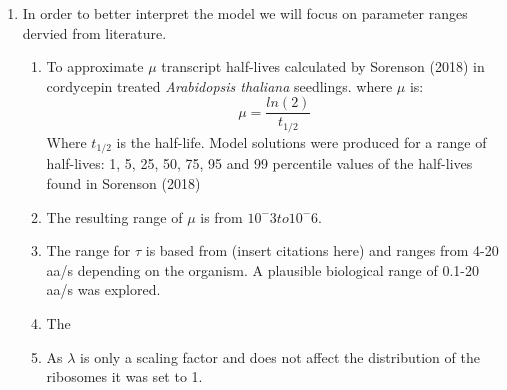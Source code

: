 \documentclass[review]{elsarticle}
\begin{document}
\begin{enumerate}
\begin{enumerate}
		\item In order to better interpret the model we will focus on parameter ranges dervied from literature. 
		\begin{enumerate}
			\item To approximate $\mu$ transcript half-lives calculated by Sorenson (2018) in cordycepin treated  \textit{Arabidopsis thaliana} seedlings. where $\mu$ is:
			\begin{equation}\label{eq:eq_unmarked_sum}
				\mu = \frac{ln(2)}{t_{1/2}}
			\end{equation}
			Where $t_{1/2}$ is the half-life. Model solutions were produced for a range of half-lives: 1, 5, 25, 50, 75, 95 and 99 percentile values of the half-lives found in Sorenson (2018)%
			\item The resulting range of $\mu$ is from $10^-3 to 10^-6$. 
			\item The range for $\tau$ is based from (insert citations here) and ranges from 4-20 aa/s depending on the organism. A plausible biological range of 0.1-20 aa/s was explored.
			\item The 
			\item As $\lambda$ is only a scaling factor and does not affect the distribution of the ribosomes it was set to 1.

		\end{enumerate}


	\end{enumerate}
		



\end{enumerate}
\end{document}
